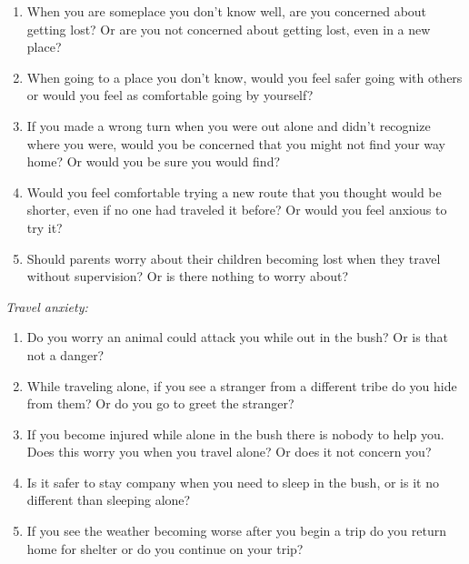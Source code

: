 \documentclass[idxtotoc,hyperref,openany]{labbook} %
\begin{document}
\begin{enumerate}

\item When you are someplace you don't know well, are you concerned about getting lost?  Or are you not concerned about getting lost, even in a new place?

\item When going to a place you don't know, would you feel safer going with others or would you feel as comfortable going by yourself?

\item If you made a wrong turn when you were out alone and didn't recognize where you were, would you be concerned that you might not find your way home?  Or would you be sure you would find?

\item Would you feel comfortable trying a new route that you thought would be shorter, even if no one had traveled it before? Or would you feel anxious to try it?

\item Should parents worry about their children becoming lost when they travel without supervision? Or is there nothing to worry about?

\end{enumerate}


\emph{Travel anxiety:}

\begin{enumerate}

\item Do you worry an animal could attack you while out in the bush? Or is that not a danger?

\item While traveling alone, if you see a stranger from a different tribe do you hide from them? Or do you go to greet the stranger?

\item If you become injured while alone in the bush there is nobody to help you. Does this worry you when you travel alone? Or does it not concern you?

\item  Is it safer to stay company when you need to sleep in the bush, or is it no different than sleeping alone?

\item If you see the weather becoming worse after you begin a trip do you return home for shelter or do you continue on your trip?

\end{enumerate}
\end{document}
